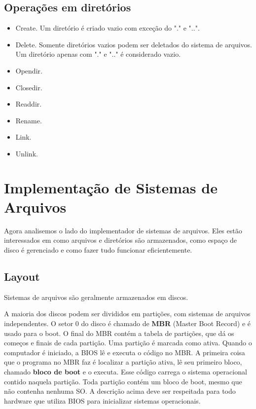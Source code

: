 \documentclass{article}
\begin{document}
\subsection{Operações em diretórios}

\begin{itemize}
  \item Create. Um diretório é criado vazio com exceção do "." e "..".
  \item Delete. Somente diretórios vazios podem ser deletados do sistema de arquivos. Um diretório apenas com "." e ".." é considerado vazio.
  \item Opendir.
  \item Closedir.
  \item Readdir.
  \item Rename.
  \item Link.
  \item Unlink.
\end{itemize}

\section{Implementação de Sistemas de Arquivos}

Agora analisemos o lado do implementador de sistemas de arquivos. Eles estão interessados em como arquivos e diretórios são armazenados, como espaço de disco é gerenciado e como fazer tudo funcionar eficientemente.

\subsection{Layout}
Sistemas de arquivos são geralmente armazenados em discos.

A maioria dos discos podem ser divididos em partições, com sistemas de arquivos independentes. O setor 0 do disco é chamado de \textbf{MBR} (Master Boot Record) e é usado para o boot. O final do MBR contém a tabela de partições, que dá os começos e finais de cada partição. Uma partição é marcada como ativa. Quando o computador é iniciado, a BIOS lê e executa o código no MBR. A primeira coisa que o programa no MBR faz é localizar a partição ativa, lê seu primeiro bloco, chamado \textbf{bloco de boot} e o executa. Esse código carrega o sistema operacional contido naquela partição. Toda partição contém um bloco de boot, mesmo que não contenha nenhuma SO. A descrição acima deve ser respeitada para todo hardware que utiliza BIOS para inicializar sistemas operacionais. 
 
\end{document}
